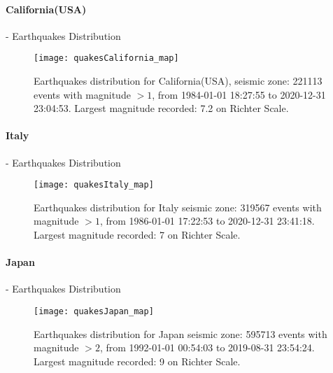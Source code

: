
\clearpage
\paragraph{California(USA)} - Earthquakes Distribution
\begin{figure}[!h]
\centering
\texttt{[image: quakesCalifornia\_map]}
\caption{Earthquakes distribution for California(USA), seismic zone: 221113 events with magnitude $>1$, from 1984-01-01 18:27:55 to 2020-12-31 23:04:53. Largest magnitude recorded: 7.2 on Richter Scale.}
\label{fig:simpleScatteritaly}
\end{figure}


\paragraph{Italy} - Earthquakes Distribution
\begin{figure}[!h]
\centering
\texttt{[image: quakesItaly\_map]}
\caption{Earthquakes distribution for Italy seismic zone: 319567 events with magnitude $>1$, from 1986-01-01 17:22:53 to 2020-12-31 23:41:18. Largest magnitude recorded: 7 on Richter Scale.}
\label{fig:simpleScatteritaly}
\end{figure}


\paragraph{Japan} - Earthquakes Distribution
\begin{figure}[!h]
\centering
\texttt{[image: quakesJapan\_map]}
\caption{Earthquakes distribution for Japan seismic zone: 595713 events with magnitude $>2$, from 1992-01-01 00:54:03 to 2019-08-31 23:54:24. Largest magnitude recorded: 9 on Richter Scale.}
\label{fig:simpleScatterJapan}
\end{figure}

